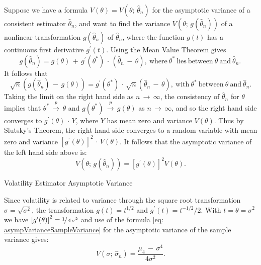 \documentclass[graybox,envcountchap,sectrefs]{svmono}\usepackage[]{graphicx}\usepackage[]{xcolor}
\begin{document}
\begin{appendices}
Suppose we have a formula $V(\theta)=V(\theta;\,\hat{\theta}_{n})$
for the asymptotic variance of a consistent estimator $\hat{\theta}_{n}$,
and want to find the variance $V\left(\theta;\,g\left(\hat{\theta}_{n}\right)\right)$
of a nonlinear transformation $g\left(\hat{\theta}_{n}\right)$ of
$\hat{\theta}_{n}$, where the function $g(t)$ has a continuous first
derivative $g^{\prime}(t)$. Using the Mean Value Theorem  gives
\begin{equation}
g\left(\hat{\theta}_{n}\right)=g(\theta)\,+\,g^{\prime}(\theta^{*})\,\cdot\,\left(\hat{\theta}_{n}\,-\,\theta\right),\ \mathrm{where}\:\theta^{*}\:\mathrm{lies}\ \mathrm{between}\ \theta\ \mathrm{and}\ \hat{\theta}_{n}.\,\label{eq:UnivariateDeltaStep1}
\end{equation}
It follows that
\begin{equation}
\sqrt{n}\left(g\left(\hat{\theta}_{n}\right)\,-\,g(\theta)\right)=g^{\prime}(\theta^{*})\,\cdot\,\sqrt{n}\left(\hat{\theta}_{n}\,-\,\theta\right),\ \mathrm{with}\:\theta^{*}\ \mathrm{between}\ \theta\ \mathrm{and}\ \hat{\theta}_{n}.\label{eq:UnivariateDeltaStep2}
\end{equation}
Taking the limit on the right hand side as $n\,\rightarrow\,\infty$,
the consistency of $\hat{\theta}_{n}$ for $\theta$ implies that
$\theta^{*}\,\stackrel{p}{\rightarrow}\,\theta$ and $g(\theta^{*})\,\stackrel{p}{\rightarrow}\,g(\theta)$
as $n\,\rightarrow\,\infty$, and so the right hand side converges
to $g^{\prime}(\theta)\,\cdot\,Y$, where $Y$ has mean zero and variance
$V(\theta)$. Thus by Slutsky's Theorem, the right hand side converges
to a random variable with mean zero and variance $\left[g^{\prime}(\theta)\right]^{2}\,\cdot\,V(\theta)$.
It follows that the asymptotic variance of the left hand side above
is:
\begin{equation}
V\left(\theta;\,g\left(\hat{\theta}_{n}\right)\right)=\left[g^{\prime}(\theta)\right]^{2}V(\theta).
\end{equation}

\begin{example}
Volatility Estimator Asymptotic Variance

Since volatility is related to variance through the square root transformation
$\sigma=\sqrt{\sigma^{2}}$, the transformation $g(t)=t^{1/2}$ and
$g^{\prime}(t)=t^{-1/2}/2$. With $t=\theta=\sigma^{2}$ we have $\left[g^{\prime}(\theta)\right]^{2}=\nicefrac{1}{\,4\,\sigma^{2}}$
and use of the formula \eqref{eq: asympVarianceSampleVariance} for
the asymptotic variance of the sample variance gives:
\begin{equation}
V(\sigma;\,\hat{\sigma}_{n})=\dfrac{\mu_{4}\,-\,\sigma^{4}}{4\sigma^{2}}.\label{eq: asympVarianceVolEst}
\end{equation}
\end{example}


\end{appendices}
\end{document}
